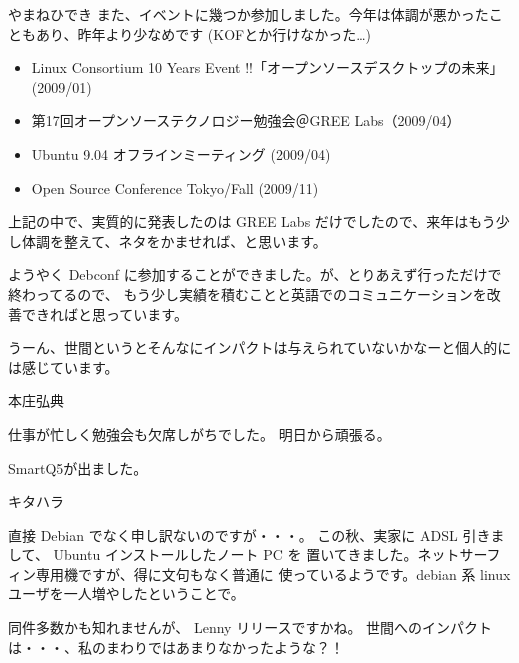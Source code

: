 \begin{prework}{やまねひでき}
また、イベントに幾つか参加しました。今年は体調が悪かったこともあり、昨年より少なめです (KOFとか行けなかった…)

\begin{itemize}
 \item Linux Consortium 10 Years Event !!「オープンソースデスクトップの未来」(2009/01)
 \item 第17回オープンソーステクノロジー勉強会＠GREE Labs（2009/04）
 \item Ubuntu 9.04 オフラインミーティング (2009/04)
 \item Open Source Conference Tokyo/Fall (2009/11)
\end{itemize}

上記の中で、実質的に発表したのは GREE Labs だけでしたので、来年はもう少し体調を整えて、ネタをかませれば、と思います。


ようやく Debconf に参加することができました。が、とりあえず行っただけで終わってるので、
もう少し実績を積むことと英語でのコミュニケーションを改善できればと思っています。

うーん、世間というとそんなにインパクトは与えられていないかなーと個人的には感じています。
\end{prework}

\begin{prework}{本庄弘典}

仕事が忙しく勉強会も欠席しがちでした。
明日から頑張る。


SmartQ5が出ました。
\end{prework}

\begin{prework}{キタハラ}

直接 Debian でなく申し訳ないのですが・・・。
この秋、実家に ADSL 引きまして、 Ubuntu インストールしたノート PC を
置いてきました。ネットサーフィン専用機ですが、得に文句もなく普通に
使っているようです。debian 系 linux ユーザを一人増やしたということで。


同件多数かも知れませんが、 Lenny リリースですかね。
世間へのインパクトは・・・、私のまわりではあまりなかったような？！
\end{prework}

